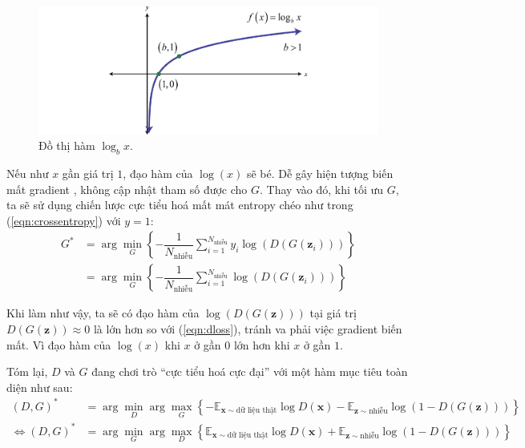 \documentclass[a4paper, 12pt]{report}
\begin{document}
\begin{figure}[!h]
\captionsetup{width=0.8\textwidth}
\centering
\includegraphics[width=14cm]{images/logx.png}
\caption{Đồ thị hàm $\log_bx$.}
\label{fig:logbx}
\end{figure}

Nếu như $x$ gần giá trị $1$, đạo hàm của $\log(x)$ sẽ bé.
Dễ gây hiện tượng biến mất gradient \cite{wikivanishing2021}, không cập nhật tham số được cho $G$.
Thay vào đó, khi tối ưu $G$, ta sẽ sử dụng chiến lược cực tiểu hoá mất mát entropy chéo như trong (\ref{eqn:crossentropy}) với $y=1$:
\begin{align}
    G^*&=\arg\min_G\left\{-\dfrac{1}{N_{\text{nhiễu}}}\sum_{i=1}^{N_{\text{nhiễu}}}y_i\log\left(D\left(G\left(\mathbf{z}_i\right)\right)\right)\right\}\nonumber\\
    &=\arg\min_G\left\{-\dfrac{1}{N_{\text{nhiễu}}}\sum_{i=1}^{N_{\text{nhiễu}}}\log\left(D\left(G\left(\mathbf{z}_i\right)\right)\right)\right\}\label{eqn:objforrealg}
\end{align}

Khi làm như vậy, ta sẽ có đạo hàm của $\log\left(D\left(G\left(\mathbf{z}\right)\right)\right)$ tại giá trị $D\left(G\left(\mathbf{z}\right)\right) \approx 0$ là lớn hơn so với (\ref{eqn:dloss}), tránh va phải việc gradient biến mất.
Vì đạo hàm của $\log(x)$ khi $x$ ở gần $0$ lớn hơn khi $x$ ở gần $1$.\vspace{5pt}

Tóm lại, $D$ và $G$ đang chơi trò ``cực tiểu hoá cực đại'' với một hàm mục tiêu toàn diện như sau:
\begin{align}
    (D, G)^* &= \arg\min_D\arg\max_G\left\{-\mathbb{E}_{\mathbf{x}\sim \text{dữ liệu thật}}\log D\left(\mathbf{x}\right)-\mathbb{E}_{\mathbf{z} \sim \text{nhiễu}}\log\left(1-D\left(G\left(\mathbf{z}\right)\right)\right)\right\}\label{eqn:minusegan}\\
    \Leftrightarrow (D, G)^* &= \arg\min_G\arg\max_D\left\{\mathbb{E}_{\mathbf{x}\sim \text{dữ liệu thật}}\log D\left(\mathbf{x}\right)+\mathbb{E}_{\mathbf{z} \sim \text{nhiễu}}\log\left(1-D\left(G\left(\mathbf{z}\right)\right)\right)\right\}\label{eqn:egan}
\end{align}
\end{document}
